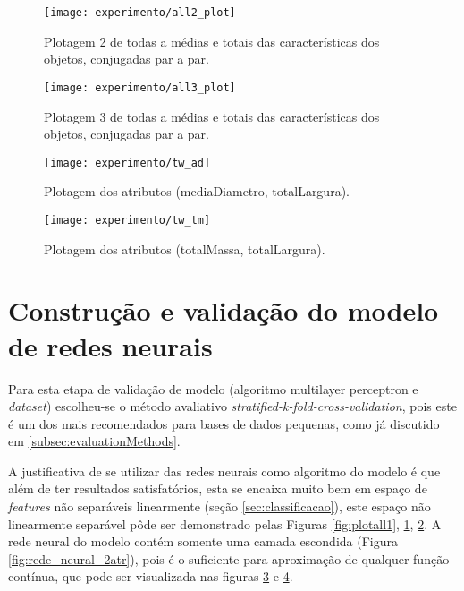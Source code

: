 \begin{figure}[!htb] \centering 
  \centering
  \texttt{[image: experimento/all2\_plot]} 
  \caption{Plotagem 2 de todas a médias e totais das características dos objetos, conjugadas par a par.} 
  \label{fig:plotall2}
\end{figure}

\begin{figure}[!htb] \centering 
  \centering
  \texttt{[image: experimento/all3\_plot]} 
  \caption{Plotagem 3 de todas a médias e totais das características dos objetos, conjugadas par a par.} 
  \label{fig:plotall3}
\end{figure}

\begin{figure}[!htb] \centering 
  \centering
  \texttt{[image: experimento/tw\_ad]} 
  \caption{Plotagem dos atributos (mediaDiametro, totalLargura). } 
  \label{fig:tw_ad}
\end{figure}

\begin{figure}[!htb] \centering 
  \centering
  \texttt{[image: experimento/tw\_tm]} 
  \caption{Plotagem dos atributos (totalMassa, totalLargura). } 
  \label{fig:tw_tm}
\end{figure}


\section{Construção e validação do modelo de redes neurais}
Para esta etapa de validação de modelo (algoritmo multilayer perceptron e \textit{dataset}) escolheu-se o método avaliativo \textit{stratified-k-fold-cross-validation}, pois este é um dos mais recomendados para bases de dados pequenas, como já discutido em \ref{subsec:evaluationMethods}. 

A justificativa de se utilizar das redes neurais como algoritmo do modelo é que além de ter resultados satisfatórios, esta se encaixa muito bem em espaço de \textit{features} não separáveis linearmente (seção \ref{sec:classificacao}), este espaço não linearmente separável pôde ser demonstrado pelas Figuras \ref{fig:plotall1}, \ref{fig:plotall2}, \ref{fig:plotall3}. A rede neural do modelo contém somente uma camada escondida (Figura \ref{fig:rede_neural_2atr}), pois é o suficiente para aproximação de qualquer função contínua\cite{Pasini:2015}, que pode ser visualizada nas figuras \ref{fig:tw_ad} e \ref{fig:tw_tm}.

